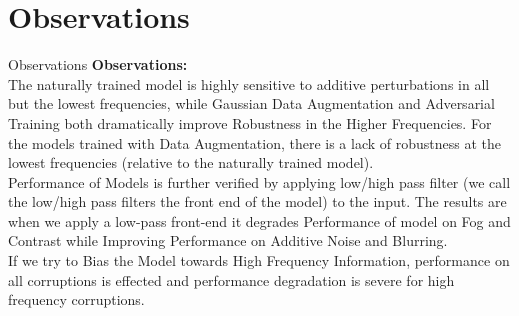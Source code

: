 \documentclass[8pt]{beamer}
\begin{document}
\section{Observations}
\begin{frame}{Observations}
\textbf{Observations:}\\
\qquad The naturally trained model is highly sensitive to additive perturbations in all but the lowest frequencies, while Gaussian Data Augmentation and Adversarial Training both dramatically improve Robustness in the Higher Frequencies. For the models trained with Data Augmentation, there is a lack of robustness at the lowest frequencies (relative to the naturally trained model).\\
\vspace{0.1in}
\qquad Performance of Models is further verified by applying low/high pass filter (we call the low/high pass filters the front end of the model) to the input. The results are when we apply a low-pass front-end it degrades Performance of model on Fog and Contrast while Improving Performance on Additive Noise and Blurring.\\
\vspace{0.05in}
\qquad If we try to Bias the Model towards High Frequency Information, performance on all corruptions is effected and performance degradation is severe for high frequency corruptions.
\end{frame}
\end{document}
